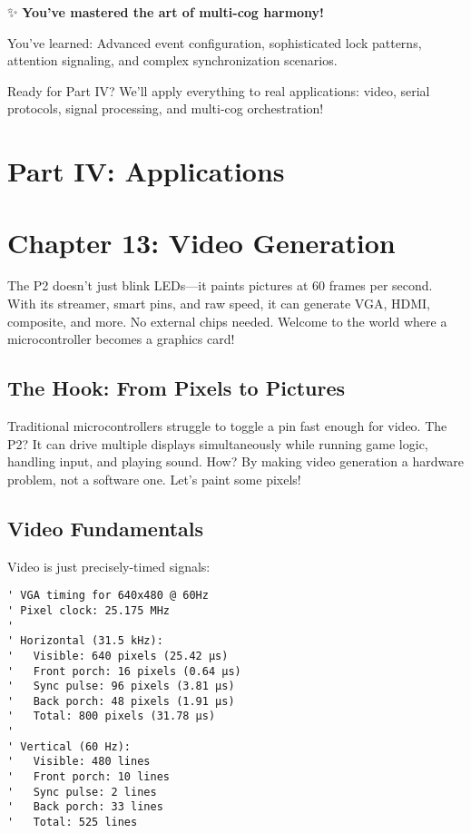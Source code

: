 \documentclass[11pt]{book}
\begin{document}
\begin{chapterend}
✨ \textbf{You've mastered the art of multi-cog harmony!}

You've learned: Advanced event configuration, sophisticated lock patterns, attention signaling, and complex synchronization scenarios.

Ready for Part IV? We'll apply everything to real applications: video, serial protocols, signal processing, and multi-cog orchestration!
\end{chapterend}

\hypertarget{part-iv-applications}{%
\section{Part IV: Applications}\label{part-iv-applications}}

\hypertarget{chapter-13-video-generation}{%
\section{Chapter 13: Video
Generation}\label{chapter-13-video-generation}}

The P2 doesn't just blink LEDs---it paints pictures at 60 frames per
second. With its streamer, smart pins, and raw speed, it can generate
VGA, HDMI, composite, and more. No external chips needed. Welcome to the
world where a microcontroller becomes a graphics card!

\hypertarget{the-hook-from-pixels-to-pictures}{%
\subsection{The Hook: From Pixels to
Pictures}\label{the-hook-from-pixels-to-pictures}}

Traditional microcontrollers struggle to toggle a pin fast enough for
video. The P2? It can drive multiple displays simultaneously while
running game logic, handling input, and playing sound. How? By making
video generation a hardware problem, not a software one. Let's paint
some pixels!

\hypertarget{video-fundamentals}{%
\subsection{Video Fundamentals}\label{video-fundamentals}}

Video is just precisely-timed signals:

\begin{lstlisting}
' VGA timing for 640x480 @ 60Hz
' Pixel clock: 25.175 MHz
' 
' Horizontal (31.5 kHz):
'   Visible: 640 pixels (25.42 µs)
'   Front porch: 16 pixels (0.64 µs)
'   Sync pulse: 96 pixels (3.81 µs)
'   Back porch: 48 pixels (1.91 µs)
'   Total: 800 pixels (31.78 µs)
'
' Vertical (60 Hz):
'   Visible: 480 lines
'   Front porch: 10 lines
'   Sync pulse: 2 lines
'   Back porch: 33 lines
'   Total: 525 lines
\end{lstlisting}
\end{document}
